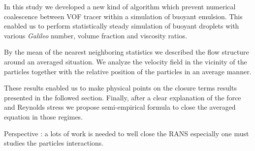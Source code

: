 
In this study we developed a new kind of algorithm which prevent numerical coalescence between VOF tracer within a simulation of buoyant emulsion. 
This enabled us to perform statistically steady simulation of buoyant droplets with various \textit{Galileo} number, volume fraction and viscosity ratios. 

By the mean of the nearest neighboring statistics we described the flow structure around an averaged situation. 
We analyze the velocity field in the vicinity of the particles together with the relative position of the particles in an average manner. 

These results enabled us to make physical points on the closure terms results presented in the followed section. 
Finally, after a clear explanation of the force and Reynolds stress we propose semi-empirical formula to close the averaged equation in those regimes. 

Perspective : a lots of work is needed to well close the RANS especially one must studies the particles interactions. 